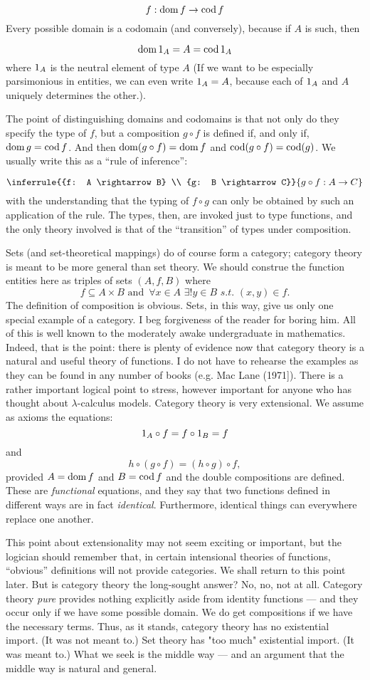 \documentclass[12pt]{article}
\def\to{\rightarrow}
\def\inc{\subseteq}
\def\dom{\mathop{\rm dom}}
\def\cod{\mathop{\rm cod}}
\def\id{{\textrm 1}}
\def\comp{\circ}
\def\l{\lambda}
\begin{document}
$$f: \dom f \to \cod f$$
%
Every possible domain is a codomain (and conversely), because if $A$ is such, then

$$\dom \id_A = A = \cod \id_A$$
%
where $\id_A$ is the neutral element of type $A$ (If we want to be especially parsimonious in entities, we can even write $\id_A = A$, because each of $\id_A$ and $A$ uniquely deter­mines the other.).

The point of distinguishing domains and codomains is that not only do they specify the type of $f$, but a composition $g \comp f$ is
defined if, and only if, $\dom g = \cod f$. And then $\dom(g \comp f) = \dom f$ and $\cod (g \comp f) = \cod (g)$. We usually write this as a ``rule of inference'':

$$
\inferrule
  {{f: A \to B} \\ {g: B \to C}}
  {g \comp f: A \to C}
$$
with the understanding that the typing of $f \comp  g$ can only be ob­tained by such an application of the rule. The types, then, are invoked just to type functions, and the only theory involv­ed is that of the ``transition'' of types under composition.

Sets (and set-theoretical mappings) do of course form a cat­egory; category theory is meant to be more general than set theory. We should construe the function entities here as tri­ples of sets $(A,f,B)$ where
$$
f \inc A \times B {\textrm{ and }}\, \forall x \in A \,\, \exists! y \in B\,\, s.t. \,\, (x,y) \in f.
$$
%
The definition of composition is obvious. Sets, in this way, give us only one special example of a category.
I beg forgiveness of the reader for boring him. All of this is well known to the moderately awake undergraduate in mathe­matics. Indeed, that is the point: there is plenty of evi­dence now that category theory is a natural and useful theory of functions. I do not have to rehearse the examples as they can be found in any number of books (e.g. Mac Lane (1971]).
There is a rather important logical point to stress, however
important for anyone who has thought about $\l$-calculus models. Category theory is very extensional. We assume as axioms the equations:
%
$$\id_A \comp f = f \comp \id_B =  f$$
%
and
$$h\comp (g \comp f) = (h \comp g) \comp f,$$
%
provided $A= \dom f$ and $B = \cod f$ and the double compositions are defined. These are {\it functional} equations, and they say that two functions defined in different ways are in fact {\it identical}.
Furthermore, identical things can everywhere replace one another.

This point about extensionality may not seem exciting or im­portant, but the logician should remember that, in certain intensional theories of functions, ``obvious'' definitions will not provide categories. We shall return to this point later. But is category theory the long-sought answer? No, no, not at all. Category theory {\it pure} provides nothing explicitly aside from identity functions --- and they occur only if we have some possible domain. We do get compositions if we have the neces­sary terms. Thus, as it stands, category theory has no existential import. (It was not meant to.) Set theory has "too much" existential import. (It was meant to.) What we seek is the middle way --- and an argument that the middle way is natural and general.
\end{document}
